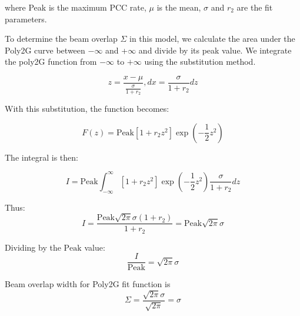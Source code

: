 where Peak is the maximum PCC rate, $\mu$ is the mean, $\sigma$ and $r_2$ are the fit parameters. 


To determine the beam overlap $\Sigma$ in this model, we calculate the area under the Poly2G curve between $-\infty$ and  +$\infty$ and divide by its peak value. We integrate the poly2G function
from \(-\infty\) to \(+\infty\) using the substitution method.

\begin{equation}
z = \frac{x - \mu}{\frac{\sigma}{1 + r_2}} ,   dx = \frac{\sigma}{1 + r_2} dz 
\end{equation}

With this substitution, the function becomes:

\begin{equation}
F(z) = \text{Peak} \left[ 1 + r_2 z^2 \right] \exp\left(-\frac{1}{2} z^2\right)
\end{equation}
  
The integral is then:

\begin{equation}
I = \text{Peak} \int_{-\infty}^{\infty} \left[ 1 + r_2 z^2 \right] \exp\left(-\frac{1}{2} z^2\right) \frac{\sigma}{1 + r_2} dz
\end{equation}






Thus:
\[ I = \frac{\text{Peak} \sqrt{2\pi} \sigma (1 + r_2) }{1+r_2} = \text{Peak} \sqrt{2\pi} \sigma \]

Dividing by the \(\text{Peak}\) value:
\[ \frac{I}{\text{Peak}} = \sqrt{2\pi} \sigma  \]

Beam overlap width for Poly2G fit function is
\begin{equation}
 \Sigma = \frac{ \sqrt{2\pi} \sigma}{\sqrt{2 \pi}} = \sigma 
\end{equation}

















